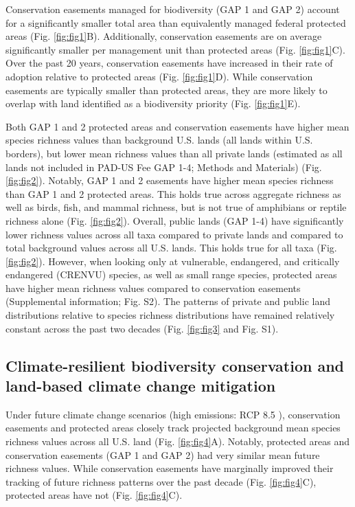 \documentclass[3p]{elsarticle} %
\begin{document}
Conservation easements managed for biodiversity (GAP 1 and GAP 2)
account for a significantly smaller total area than equivalently managed
federal protected areas (Fig. \ref{fig:fig1}B). Additionally,
conservation easements are on average significantly smaller per
management unit than protected areas (Fig. \ref{fig:fig1}C). Over the
past 20 years, conservation easements have increased in their rate of
adoption relative to protected areas (Fig. \ref{fig:fig1}D). While
conservation easements are typically smaller than protected areas, they
are more likely to overlap with land identified as a biodiversity
priority (Fig. \ref{fig:fig1}E).

Both GAP 1 and 2 protected areas and conservation easements have higher
mean species richness values than background U.S. lands (all lands
within U.S. borders), but lower mean richness values than all private
lands (estimated as all lands not included in PAD-US Fee GAP 1-4;
Methods and Materials) (Fig. \ref{fig:fig2}). Notably, GAP 1 and 2
easements have higher mean species richness than GAP 1 and 2 protected
areas. This holds true across aggregate richness as well as birds, fish,
and mammal richness, but is not true of amphibians or reptile richness
alone (Fig. \ref{fig:fig2}). Overall, public lands (GAP 1-4) have
significantly lower richness values across all taxa compared to private
lands and compared to total background values across all U.S. lands.
This holds true for all taxa (Fig. \ref{fig:fig2}). However, when
looking only at vulnerable, endangered, and critically endangered
(CRENVU) species, as well as small range species, protected areas have
higher mean richness values compared to conservation easements
(Supplemental information; Fig. S2). The patterns of private and public
land distributions relative to species richness distributions have
remained relatively constant across the past two decades (Fig.
\ref{fig:fig3} and Fig. S1).

\hypertarget{climate-resilient-biodiversity-conservation-and-land-based-climate-change-mitigation}{%
\subsection{Climate-resilient biodiversity conservation and land-based
climate change
mitigation}\label{climate-resilient-biodiversity-conservation-and-land-based-climate-change-mitigation}}

Under future climate change scenarios (high emissions: RCP 8.5
\cite{Lawler2020b}), conservation easements and protected areas closely
track projected background mean species richness values across all U.S.
land (Fig. \ref{fig:fig4}A). Notably, protected areas and conservation
easements (GAP 1 and GAP 2) had very similar mean future richness
values. While conservation easements have marginally improved their
tracking of future richness patterns over the past decade (Fig.
\ref{fig:fig4}C), protected areas have not (Fig. \ref{fig:fig4}C).
\end{document}
